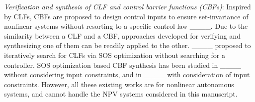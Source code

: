 {\it Verification and synthesis of CLF and control barrier functions (CBFs)}: Inspired by CLFs, CBFs are proposed to design control inputs to ensure set-invariance of nonlinear systems without resorting to a specific control law ____. Due to the similarity between a CLF and a CBF, approaches developed for verifying and synthesizing one of them can be readily applied to the other.  ____ proposed to iteratively search for CLFs via SOS optimization without searching for a controller. %
SOS optimization based CBF synthesis has been studied in   ____ without considering input constraints, and in ____ with consideration of input constraints. 
However, all these existing works are for nonlinear autonomous systems, and cannot handle the NPV systems considered in this manuscript. 

%